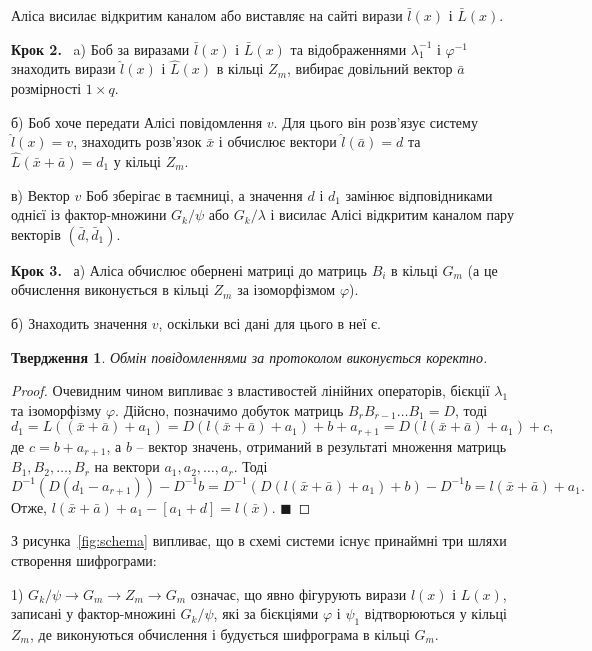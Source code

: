 \documentclass{ceurart}
\newtheorem{utver}{Твердження}
\begin{document}
Аліса висилає відкритим каналом або виставляє на сайті
вирази \(\bar l(x)\) і \(\bar L(x)\).

\textbf{Крок 2.} \ a) Боб за виразами \(\bar l(x)\) і \(\bar L(x)\) та відображеннями
\(\lambda_1^{-1}\) і \(\varphi^{-1}\) знаходить вирази \(\hat l(x)\) і \(\hat L(x)\)
в кільці \(Z_m\), вибирає довільний вектор \(\bar a\) розмірності \(1\times q\).

б) Боб хоче передати Алісі повідомлення \(v\). Для цього він
   розв'язує систему \(\hat l(x)=v\), знаходить розв'язок \(\bar x\)
   і обчислює вектори \(\hat l(\bar a) = d\) та \(\hat L(\bar x + \bar a) = d_1\)
   у кільці \(Z_m\).

в) Вектор \(v\) Боб зберігає в таємниці, а значення \(d\) і \(d_1\)
   замінює відповідниками однієї із фактор-множини \(G_k/\psi\) або \(G_k/\lambda\)
   і висилає Алісі відкритим каналом пару векторів \((\bar d,\bar d_1)\).

\textbf{Крок 3.} \ а) Аліса обчислює обернені матриці до матриць \(B_i\) в
   кільці \(G_m\) (а це обчислення виконується в кільці
   \(Z_m\) за ізоморфізмом \(\varphi\)).

б) Знаходить значення \(v\), оскільки всі дані для цього в неї є.

\begin{utver}
Обмін повідомленнями за протоколом виконується коректно.
\end{utver}
\begin{proof} %
Очевидним чином випливає з властивостей лінійних
операторів, бієкції \(\lambda_1\) та ізоморфізму \(\varphi\).
Дійсно, позначимо добуток матриць \(B_rB_{r-1}\ldots B_1= D\), тоді
\[
 d_1=L((\bar x + \bar a) + a_1) = D(l(\bar x + \bar a) + a_1) + b + a_{r+1}=
 D(l(\bar x + \bar a)+a_1) + c,
\]
де \(c = b + a_{r+1}\), а \(b\) -- вектор значень, отриманий в результаті
множення матриць \(B_1,B_2,\ldots, B_r\) на вектори \(a_1,a_2,\ldots,a_r\). Тоді
\[
D^{-1}(D(d_1-a_{r+1})) - D^{-1}b = D^{-1}(D(l(\bar x + \bar a)+a_1) + b) - D^{-1}b = l(\bar x + \bar a) + a_1.
\]
Отже, \(l(\bar x + \bar a) + a_1 - [a_1 + d] = l(\bar x)\). $\blacksquare$ %
\end{proof}

З рисунка~\ref{fig:schema} випливає, що в схемі системи існує принаймні три
шляхи створення шифрограми:

1) \(G_k/\psi \to G_m \to Z_m \to G_m\) означає, що явно
фігурують вирази \(l(x)\) і \(L(x)\), записані у фактор-множині
\(G_k/\psi\), які за бієкціями \(\varphi\) і \(\psi_1\) відтворюються
у кільці \(Z_m\), де виконуються обчислення і будується шифрограма
в кільці \(G_m\).
\end{document}
